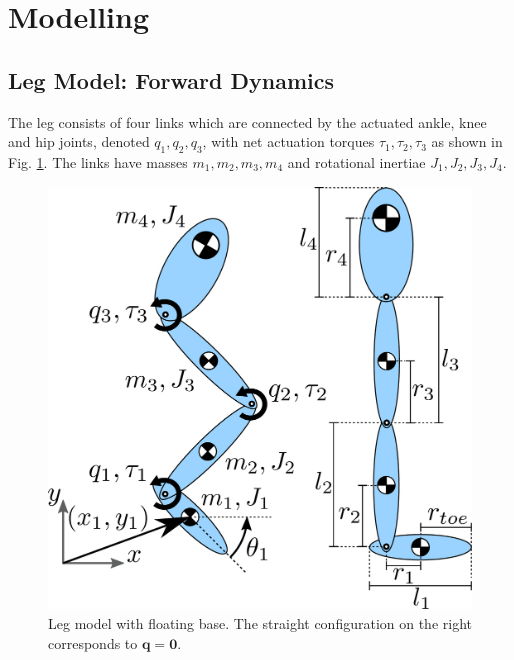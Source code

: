 \documentclass[letterpaper, 10 pt, conference]{ieeeconf}  %
\begin{document}
\section{Modelling} 
\label{sec:modelling}

\subsection{Leg Model: Forward Dynamics} 
The leg consists of four links which are connected by the actuated ankle, knee and hip joints, denoted $q_1,q_2,q_3$, with net actuation torques $\tau_1,\tau_2,\tau_3$ as shown in Fig. \ref{fig:Leg_3DoF_model}. The links have masses $m_1,m_2,m_3,m_4$ and rotational inertiae $J_1,J_2,J_3,J_4$.

\begin{figure}[ht]
	\centering
	\includegraphics[width=0.7\linewidth]{Leg_3DoF_model}
	\caption{Leg model with floating base. The straight configuration on
		the right corresponds to $\mathbf{q} = \mathbf{0}$.}
	\label{fig:Leg_3DoF_model}
\end{figure}
\end{document}
